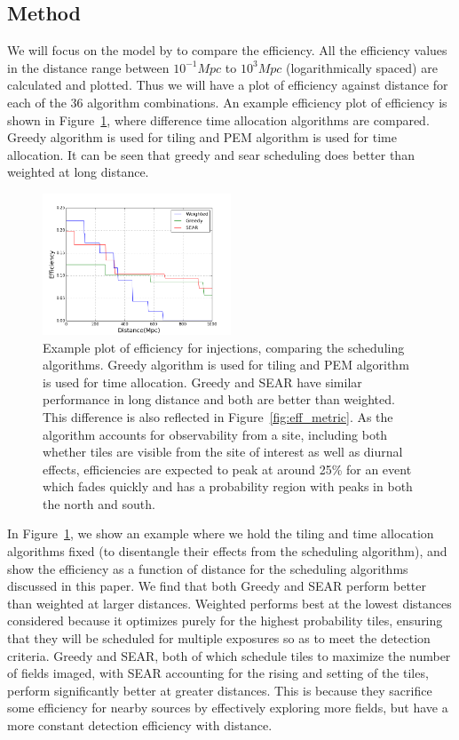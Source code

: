 \documentclass[twocolumn]{aastex62}
\begin{document}
\subsection{Method}
We will focus on the model by \cite{Me2017} to compare the efficiency. All the efficiency values in the distance range between $10^{-1} Mpc$ to $10^3 Mpc$ (logarithmically spaced) are calculated and plotted. Thus we will have a plot of efficiency against distance for each of the 36 algorithm combinations. An example efficiency plot of efficiency is shown in Figure~\ref{fig:eff_ex}, where difference time allocation algorithms are compared. Greedy algorithm is used for tiling and PEM algorithm is used for time allocation. It can be seen that greedy and sear scheduling does better than weighted at long distance. 

\begin{figure}[t]
\centering
\includegraphics[width=0.5\textwidth]{plots/eff_ex.png}
\caption{Example plot of efficiency for \cite{Me2017} injections, comparing the scheduling algorithms. Greedy algorithm is used for tiling and PEM algorithm is used for time allocation. Greedy and SEAR have similar performance in long distance and both are better than weighted. This difference is also reflected in Figure~\ref{fig:eff_metric}. As the algorithm accounts for observability from a site, including both whether tiles are visible from the site of interest as well as diurnal effects, efficiencies are expected to peak at around 25\% for an event which fades quickly and has a probability region with peaks in both the north and south.}
\label{fig:eff_ex}
\end{figure}
In Figure~\ref{fig:eff_ex}, we show an example where we hold the tiling and time allocation algorithms fixed (to disentangle their effects from the scheduling algorithm), and show the efficiency as a function of distance for the scheduling algorithms discussed in this paper. We find that both Greedy and SEAR perform better than weighted at larger distances. Weighted performs best at the lowest distances considered because it optimizes purely for the highest probability tiles, ensuring that they will be scheduled for multiple exposures so as to meet the detection criteria. Greedy and SEAR, both of which schedule tiles to maximize the number of fields imaged, with SEAR accounting for the rising and setting of the tiles, perform significantly better at greater distances. This is because they sacrifice some efficiency for nearby sources by effectively exploring more fields, but have a more constant detection efficiency with distance.
\end{document}

